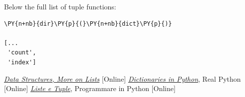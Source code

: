 Below the full list of tuple functions:
\begin{codebox}[breakable, size=fbox, boxrule=1pt, pad at break*=1mm,colback=cellbackground, colframe=cellborder]
\begin{Verbatim}[commandchars=\\\{\}]
\PY{n+nb}{dir}\PY{p}{(}\PY{n+nb}{dict}\PY{p}{)}

[...
 'count',
 'index']
\end{Verbatim}
\end{codebox}

\begin{thebibliography}{9}
 \href{https://docs.python.org/3/tutorial/datastructures.html}{\emph{Data Structures, More on Lists}} [Online]
 \href{https://realpython.com/python-dicts/}{\emph{Dictionaries in Python}}, Real Python [Online]
 \href{https://www.programmareinpython.it/video-corso-python-base/14-liste-e-tuple/}{\emph{Liste e Tuple}}, Programmare in Python [Online]
\end{thebibliography}

